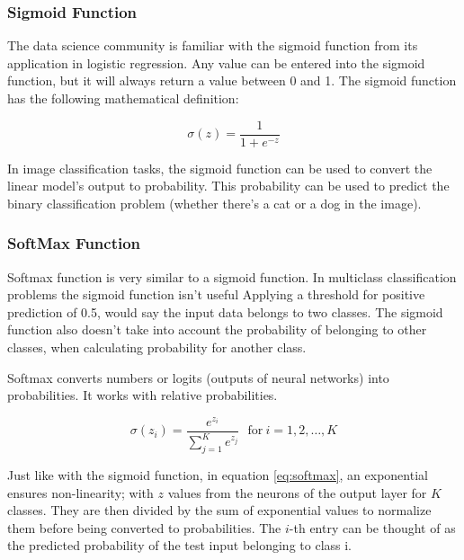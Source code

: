 \subsubsection*{Sigmoid Function}
The data science community is familiar with the sigmoid function from its application in logistic regression. Any value can be entered into the sigmoid function, but it will always return a value between 0 and 1. The sigmoid function has the following mathematical definition:

\begin{equation}
	\sigma(z) = \frac{1} {1 + e^{-z}}
\end{equation}

In image classification tasks, the sigmoid function can be used to convert the linear model's output to probability. This probability can be used to predict the binary classification problem (whether there's a cat or a dog in the image). 


\subsubsection*{SoftMax Function
}
Softmax function is very similar to a sigmoid function. In multiclass classification problems the sigmoid function isn't useful Applying a threshold for positive prediction of 0.5, would say the input data belongs to two classes. The sigmoid function also doesn't take into account the probability of belonging to other classes, when calculating probability for another class. 

Softmax converts numbers or logits (outputs of neural networks) into probabilities. It works with relative probabilities.


\begin{equation}
	\sigma(z_i) = \frac{e^{z_{i}}}{\sum_{j=1}^K e^{z_{j}}} \ \ \ \text{for}\ i=1,2,\dots,K
	\label{eq:softmax}
\end{equation}

Just like with the sigmoid function, in equation \ref{eq:softmax}, an exponential ensures non-linearity; with $z$ values from the neurons of the output layer for $K$ classes. They are then divided by the sum of exponential values to normalize them before being converted to probabilities. The $i$-th entry can be thought of as the predicted probability of the test input belonging to class i.



